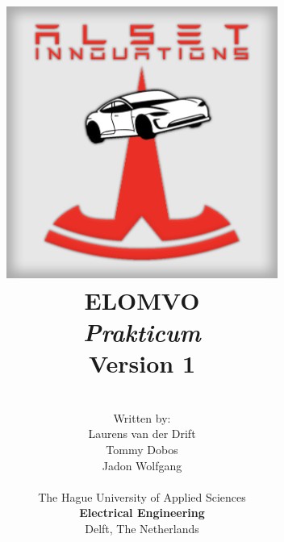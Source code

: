 \title{
\includegraphics[width=3.5in]{img/Logo.png} \\
\vspace*{1in}
\textbf{ELOMVO}\\
\textit{Prakticum}\\
Version 1
}
\author{
\vspace*{0.5in} \\
  Written by:\\
  Laurens van der Drift\\
  Tommy Dobos\\
  Jadon Wolfgang\\
\vspace*{0.2in} \\
    The Hague University of Applied Sciences\\
    \textbf{Electrical Engineering}\\
    Delft, The Netherlands
   } 